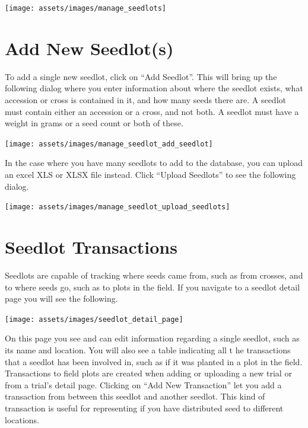 \documentclass[
  12pt,
]{book}
\begin{document}
\begin{center}\texttt{[image: assets/images/manage\_seedlots]} \end{center}

\hypertarget{add-new-seedlots}{%
\section{Add New Seedlot(s)}\label{add-new-seedlots}}

To add a single new seedlot, click on ``Add Seedlot''. This will bring up the following dialog where you enter information about where the seedlot exists, what accession or cross is contained in it, and how many seeds there are. A seedlot must contain either an accession or a cross, and not both. A seedlot must have a weight in grams or a seed count or both of these.

\begin{center}\texttt{[image: assets/images/manage\_seedlot\_add\_seedlot]} \end{center}

In the case where you have many seedlots to add to the database, you can upload an excel XLS or XLSX file instead. Click ``Upload Seedlots'' to see the following dialog.

\begin{center}\texttt{[image: assets/images/manage\_seedlot\_upload\_seedlots]} \end{center}

\hypertarget{seedlot-transactions}{%
\section{Seedlot Transactions}\label{seedlot-transactions}}

Seedlots are capable of tracking where seeds came from, such as from crosses, and to where seeds go, such as to plots in the field. If you navigate to a seedlot detail page you will see the following.

\begin{center}\texttt{[image: assets/images/seedlot\_detail\_page]} \end{center}

On this page you see and can edit information regarding a single seedlot, such as its name and location. You will also see a table indicating all t he transactions that a seedlot has been involved in, such as if it was planted in a plot in the field. Transactions to field plots are created when adding or uploading a new trial or from a trial's detail page. Clicking on ``Add New Transaction'' let you add a transaction from between this seedlot and another seedlot. This kind of transaction is useful for representing if you have distributed seed to different locations.
\end{document}
